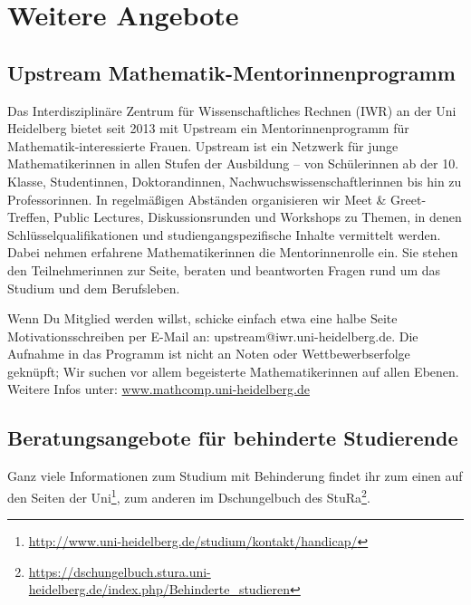 \section*{Weitere Angebote}

\subsection*{Upstream Mathematik-Mentorinnenprogramm}
Das Interdisziplinäre Zentrum für Wissenschaftliches Rechnen (IWR) an der Uni
Heidelberg bietet seit 2013 mit Upstream ein Mentorinnenprogramm für
Mathematik-interessierte Frauen.  Upstream ist ein Netzwerk für junge
Mathematikerinnen in allen Stufen der Ausbildung -- von Schülerinnen ab der 10.
Klasse, Studentinnen, Doktorandinnen, Nachwuchswissenschaftlerinnen bis hin zu
Professorinnen. In regelmäßigen Abständen organisieren wir Meet \&
Greet-Treffen, Public Lectures, Diskussionsrunden und Workshops zu Themen, in
denen Schlüsselqualifikationen und studiengangspezifische Inhalte vermittelt
werden. Dabei nehmen erfahrene Mathematikerinnen die Mentorinnenrolle ein. Sie
stehen den Teilnehmerinnen zur Seite, beraten und beantworten Fragen rund um
das Studium und dem Berufsleben.

Wenn Du Mitglied werden willst, schicke einfach etwa eine halbe Seite
Motivationsschreiben per E-Mail an: upstream@iwr.uni-heidelberg.de. Die Aufnahme
in das Programm ist nicht an Noten oder Wettbewerbserfolge geknüpft; Wir suchen
vor allem begeisterte Mathematikerinnen auf allen Ebenen.  Weitere Infos unter:
\url{www.mathcomp.uni-heidelberg.de}

\subsection*{Beratungsangebote für behinderte Studierende}
Ganz viele Informationen zum Studium mit Behinderung findet ihr zum einen auf
den Seiten der
Uni\footnote{\url{http://www.uni-heidelberg.de/studium/kontakt/handicap/}}, zum
anderen im Dschungelbuch des
StuRa\footnote{\url{https://dschungelbuch.stura.uni-heidelberg.de/index.php/Behinderte_studieren}}.
